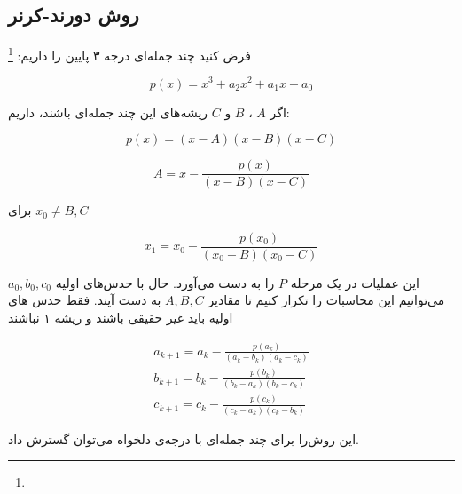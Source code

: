 \subsection{
  روش دورند-کرنر
}

فرض کنید چند جمله‌ای درجه ۳ پایین را داریم:
\footnote{}

\begin{equation}
  p(x) = x^3 + a_2x^2 + a_1x + a_0
\end{equation}

اگر
$A$
،
$B$
و
$C$
ریشه‌های این چند جمله‌ای باشند، داریم:

\begin{equation}
  p(x) = (x - A) (x - B) (x - C)
\end{equation}

\begin{equation}
  A = x - \frac{p(x)}{(x - B) (x - C)}
\end{equation}

برای
$x_0 \ne B, C$

\begin{equation}
  x_1 = x_0 - \frac{p(x_0)}{(x_0 - B) (x_0 - C)}
\end{equation}

این عملیات در یک مرحله
$P$
را به دست می‌آورد.
حال با حدس‌های اولیه
$a_0, b_0, c_0$
می‌توانیم این محاسبات را تکرار کنیم تا مقادیر
$A, B, C$
به دست آیند.
فقط حدس های اولیه باید غیر حقیقی باشند و ریشه ۱ نباشند

\begin{equation}
  \begin{split}
    a_{k + 1} = a_k - \frac{p(a_k)}{(a_k - b_k) (a_k - c_k)} \\
    b_{k + 1} = b_k - \frac{p(b_k)}{(b_k - a_k) (b_k - c_k)} \\
    c_{k + 1} = c_k - \frac{p(c_k)}{(c_k - a_k) (c_k - b_k)}
  \end{split}
\end{equation}


این روش‌را برای چند جمله‌ای با درجه‌ی دلخواه می‌توان گسترش داد.
